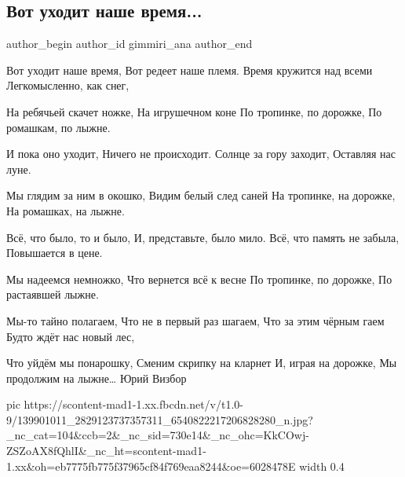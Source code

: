  
 
 
 
 
\subsection{Вот уходит наше время...}
\ifcmt
  author_begin
   author_id gimmiri_ana
  author_end
\fi

\obeycr
Вот уходит наше время,
Вот редеет наше племя.
Время кружится над всеми
Легкомысленно, как снег,

На ребячьей скачет ножке,
На игрушечном коне
По тропинке, по дорожке,
По ромашкам, по лыжне.

И пока оно уходит,
Ничего не происходит.
Солнце за гору заходит,
Оставляя нас луне.

Мы глядим за ним в окошко,
Видим белый след саней
На тропинке, на дорожке,
На ромашках, на лыжне.

Всё, что было, то и было,
И, представьте, было мило.
Всё, что память не забыла,
Повышается в цене.

Мы надеемся немножко,
Что вернется всё к весне
По тропинке, по дорожке,
По растаявшей лыжне.

Мы-то тайно полагаем,
Что не в первый раз шагаем,
Что за этим чёрным гаем
Будто ждёт нас новый лес,

Что уйдём мы понарошку,
Сменим скрипку на кларнет
И, играя на дорожке,
Мы продолжим на лыжне…                                             Юрий Визбор
\restorecr

\ifcmt
  pic https://scontent-mad1-1.xx.fbcdn.net/v/t1.0-9/139901011_2829123737357311_6540822217206828280_n.jpg?_nc_cat=104&ccb=2&_nc_sid=730e14&_nc_ohc=KkCOwj-ZSZoAX8fQhlI&_nc_ht=scontent-mad1-1.xx&oh=eb7775fb775f37965cf84f769eaa8244&oe=6028478E
  width 0.4
\fi

